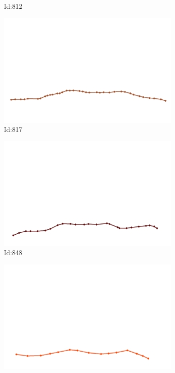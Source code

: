 \documentclass[12pt,twoside]{report}
\begin{document}
\begin{figure}
\begin{subfigure}[b]{0.20\textwidth}
\caption{Id:812}
\end{subfigure}
\begin{subfigure}[b]{0.20\textwidth}
\centering
\includegraphics[width=\textwidth]{../trajectories/817.png}
\caption{Id:817}
\end{subfigure}
\begin{subfigure}[b]{0.20\textwidth}
\centering
\includegraphics[width=\textwidth]{../trajectories/848.png}
\caption{Id:848}
\end{subfigure}
\begin{subfigure}[b]{0.20\textwidth}
\centering
\includegraphics[width=\textwidth]{../trajectories/863.png}

\end{subfigure}
\end{figure}
\end{document}
